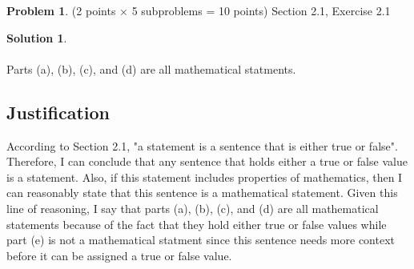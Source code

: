 \documentclass{article}
\theoremstyle{definition}
\newtheorem{problem}{Problem}
\newtheorem*{solution}{Solution}
\begin{document}
\newpage
\begin{problem} (2 points $\times$ 5 subproblems = 10 points) Section 2.1, Exercise 2.1
\end{problem}
\begin{solution}
\hspace{1cm}
\\
\\
Parts (a), (b), (c), and (d) are all mathematical statments.
\subsection*{Justification}
According to Section 2.1, "a statement is a sentence that is either true or false". Therefore, I can conclude that any sentence that holds either a true or false value is a statement. Also, if this statement includes properties of mathematics, then I can reasonably state that this sentence is a mathematical statement. Given this line of reasoning, I say that parts (a), (b), (c), and (d) are all mathematical statements because of the fact that they hold either true or false values while part (e) is not a mathematical statment since this sentence needs more context before it can be assigned a true or false value.
\end{solution}
\end{document}
